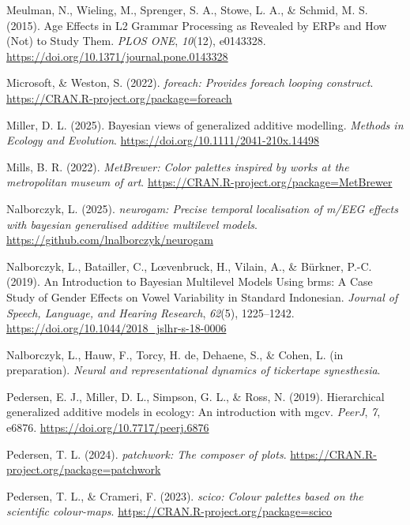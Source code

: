 \documentclass[
  doc,
  floatsintext,
  longtable,
  a4paper,
  nolmodern,
  notxfonts,
  notimes,
  donotrepeattitle,
  colorlinks=true,linkcolor=blue,citecolor=blue,urlcolor=blue]{apa7}
\newlength{\cslhangindent}
\newenvironment{CSLReferences}[2] %
 {\begin{list}{}{%
  \setlength{\itemindent}{0pt}
  \setlength{\leftmargin}{0pt}
  \setlength{\parsep}{0pt}
  \ifodd #1
   \setlength{\leftmargin}{\cslhangindent}
   \setlength{\itemindent}{-1\cslhangindent}
  \fi
  \setlength{\itemsep}{#2\baselineskip}}}
 {\end{list}}
\begin{document}
\begin{CSLReferences}{1}{0}
Meulman, N., Wieling, M., Sprenger, S. A., Stowe, L. A., \& Schmid, M.
S. (2015). Age Effects in L2 Grammar Processing as Revealed by ERPs and
How (Not) to Study Them. \emph{PLOS ONE}, \emph{10}(12), e0143328.
\url{https://doi.org/10.1371/journal.pone.0143328}

Microsoft, \& Weston, S. (2022). \emph{{foreach}: Provides foreach
looping construct}. \url{https://CRAN.R-project.org/package=foreach}

Miller, D. L. (2025). Bayesian views of generalized additive modelling.
\emph{Methods in Ecology and Evolution}.
\url{https://doi.org/10.1111/2041-210x.14498}

Mills, B. R. (2022). \emph{{MetBrewer}: Color palettes inspired by works
at the metropolitan museum of art}.
\url{https://CRAN.R-project.org/package=MetBrewer}

Nalborczyk, L. (2025). \emph{{neurogam}: Precise temporal localisation
of m/EEG effects with bayesian generalised additive multilevel models}.
\url{https://github.com/lnalborczyk/neurogam}

Nalborczyk, L., Batailler, C., Lœvenbruck, H., Vilain, A., \& Bürkner,
P.-C. (2019). An Introduction to Bayesian Multilevel Models Using brms:
A Case Study of Gender Effects on Vowel Variability in Standard
Indonesian. \emph{Journal of Speech, Language, and Hearing Research},
\emph{62}(5), 1225--1242.
\url{https://doi.org/10.1044/2018_jslhr-s-18-0006}

Nalborczyk, L., Hauw, F., Torcy, H. de, Dehaene, S., \& Cohen, L. (in
preparation). \emph{Neural and representational dynamics of tickertape
synesthesia}.

Pedersen, E. J., Miller, D. L., Simpson, G. L., \& Ross, N. (2019).
Hierarchical generalized additive models in ecology: An introduction
with mgcv. \emph{PeerJ}, \emph{7}, e6876.
\url{https://doi.org/10.7717/peerj.6876}

Pedersen, T. L. (2024). \emph{{patchwork}: The composer of plots}.
\url{https://CRAN.R-project.org/package=patchwork}

Pedersen, T. L., \& Crameri, F. (2023). \emph{{scico}: Colour palettes
based on the scientific colour-maps}.
\url{https://CRAN.R-project.org/package=scico}


\end{CSLReferences}
\end{document}

